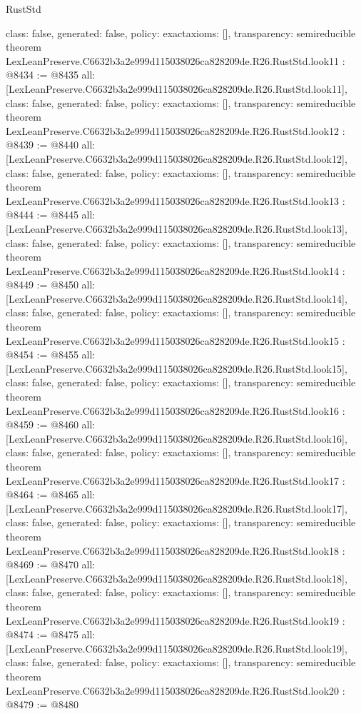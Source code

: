 \begin{lexlean}{RustStd}
\begin{coremodule}
{  class: false,
  generated: false,
  policy: exact{axioms: []},
  transparency: semireducible
}
theorem LexLeanPreserve.C6632b3a2e999d115038026ca828209de.R26.RustStd.look11 : @8434 := @8435 {
  all: [LexLeanPreserve.C6632b3a2e999d115038026ca828209de.R26.RustStd.look11],
  class: false,
  generated: false,
  policy: exact{axioms: []},
  transparency: semireducible
}
theorem LexLeanPreserve.C6632b3a2e999d115038026ca828209de.R26.RustStd.look12 : @8439 := @8440 {
  all: [LexLeanPreserve.C6632b3a2e999d115038026ca828209de.R26.RustStd.look12],
  class: false,
  generated: false,
  policy: exact{axioms: []},
  transparency: semireducible
}
theorem LexLeanPreserve.C6632b3a2e999d115038026ca828209de.R26.RustStd.look13 : @8444 := @8445 {
  all: [LexLeanPreserve.C6632b3a2e999d115038026ca828209de.R26.RustStd.look13],
  class: false,
  generated: false,
  policy: exact{axioms: []},
  transparency: semireducible
}
theorem LexLeanPreserve.C6632b3a2e999d115038026ca828209de.R26.RustStd.look14 : @8449 := @8450 {
  all: [LexLeanPreserve.C6632b3a2e999d115038026ca828209de.R26.RustStd.look14],
  class: false,
  generated: false,
  policy: exact{axioms: []},
  transparency: semireducible
}
theorem LexLeanPreserve.C6632b3a2e999d115038026ca828209de.R26.RustStd.look15 : @8454 := @8455 {
  all: [LexLeanPreserve.C6632b3a2e999d115038026ca828209de.R26.RustStd.look15],
  class: false,
  generated: false,
  policy: exact{axioms: []},
  transparency: semireducible
}
theorem LexLeanPreserve.C6632b3a2e999d115038026ca828209de.R26.RustStd.look16 : @8459 := @8460 {
  all: [LexLeanPreserve.C6632b3a2e999d115038026ca828209de.R26.RustStd.look16],
  class: false,
  generated: false,
  policy: exact{axioms: []},
  transparency: semireducible
}
theorem LexLeanPreserve.C6632b3a2e999d115038026ca828209de.R26.RustStd.look17 : @8464 := @8465 {
  all: [LexLeanPreserve.C6632b3a2e999d115038026ca828209de.R26.RustStd.look17],
  class: false,
  generated: false,
  policy: exact{axioms: []},
  transparency: semireducible
}
theorem LexLeanPreserve.C6632b3a2e999d115038026ca828209de.R26.RustStd.look18 : @8469 := @8470 {
  all: [LexLeanPreserve.C6632b3a2e999d115038026ca828209de.R26.RustStd.look18],
  class: false,
  generated: false,
  policy: exact{axioms: []},
  transparency: semireducible
}
theorem LexLeanPreserve.C6632b3a2e999d115038026ca828209de.R26.RustStd.look19 : @8474 := @8475 {
  all: [LexLeanPreserve.C6632b3a2e999d115038026ca828209de.R26.RustStd.look19],
  class: false,
  generated: false,
  policy: exact{axioms: []},
  transparency: semireducible
}
theorem LexLeanPreserve.C6632b3a2e999d115038026ca828209de.R26.RustStd.look20 : @8479 := @8480 {
}
\end{coremodule}
\end{lexlean}
